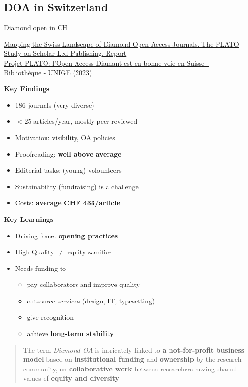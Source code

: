 \documentclass[10pt,compress,serif,aspectratio=169]{beamer}
\begin{document}

\subsection{DOA in Switzerland}

\begin{frame}[t]{Diamond open in CH}

{\small
 \href{https://zenodo.org/doi/10.5281/zenodo.7461727}{Mapping the Swiss Landscape of Diamond Open Access Journals. The PLATO Study on Scholar-Led Publishing. Report}\\
 \href{https://www.unige.ch/biblio/fr/actus/projet-plato/}{Projet PLATO: l’Open Access Diamant est en bonne voie en Suisse - Bibliothèque - UNIGE (2023)}
}
 \vfill

\begin{minipage}{.49\textwidth}
   \textbf{Key Findings}
   \begin{itemize}
   \item 186 journals (very diverse)
   \item $< 25$ articles/year, mostly peer reviewed
   \item Motivation: visibility, OA policies
   \item Proofreading: \textbf{well above average}
   \item Editorial tasks: (young) volounteers
   \item Sustainability (fundraising) is a challenge
   \item Costs: \textbf{average CHF 433/article} 
   \end{itemize}
 \end{minipage}
 \begin{minipage}{.49\textwidth}
\pause
   \textbf{Key Learnings}
   \begin{itemize}
   \item Driving force: \textbf{opening practices}
   \item High Quality $\neq$ equity sacrifice
   \item Needs funding to
     \begin{itemize}
     \item pay collaborators and improve quality
     \item outsource services (design, IT, typesetting)
     \item give recognition 
     \item achieve \textbf{long-term stability}
     \end{itemize}
   \end{itemize}

 \end{minipage}
 \vfill
 \pause
 \begin{quote}
   The term \textit{Diamond OA} is intricately linked to \textbf{a not-for-profit business model} based on \textbf{institutional funding} and \textbf{ownership} by the research community, on \textbf{collaborative work} between researchers having shared values of \textbf{equity and diversity}
 \end{quote}

\end{frame}
\end{document}
